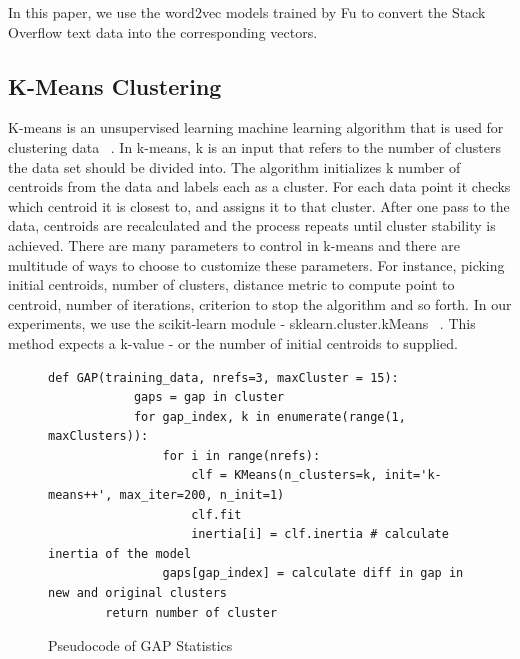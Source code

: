 \documentclass[sigconf]{acmart}
\theoremstyle{break}
\begin{document}
    In this paper, we use the word2vec models trained by Fu to convert the Stack Overflow text data into the corresponding vectors.

    \subsection{K-Means Clustering}
    \label{sssec:K-Means Clustering}
    K-means is an unsupervised learning machine learning algorithm that is used for clustering data ~\cite{jain2010data}. In k-means, k is an input that refers to the number of clusters the data set should be divided into. The algorithm initializes k number of centroids from the data and labels each as a cluster. For each data point it checks which centroid it is closest to, and assigns it to that cluster. After one pass to the data, centroids are recalculated and the process repeats until cluster stability is achieved. There are many parameters to control in k-means and there are multitude of ways to choose to customize these parameters. For instance, picking initial centroids, number of clusters, distance metric to compute point to centroid, number of iterations, criterion to stop the algorithm and so forth. In our experiments, we use the scikit-learn module -  sklearn.cluster.kMeans ~\cite{pedregosa2011scikit}. This method expects a k-value - or the number of initial centroids to supplied.
    \begin{figure}\small
        \begin{lstlisting}[mathescape,linewidth=2in,frame=n,numbers=none]
        def GAP(training_data, nrefs=3, maxCluster = 15):
            gaps = gap in cluster
            for gap_index, k in enumerate(range(1, maxClusters)):
                for i in range(nrefs):
                    clf = KMeans(n_clusters=k, init='k-means++', max_iter=200, n_init=1)
                    clf.fit
                    inertia[i] = clf.inertia # calculate inertia of the model
                gaps[gap_index] = calculate diff in gap in new and original clusters
        return number of cluster
        \end{lstlisting} 
        \vspace{-0.2cm}
        \caption{Pseudocode of GAP Statistics}
        \label{fig:GAP_pseudocode} 
        \vspace{-0.3cm}
    \end{figure}
\end{document}
